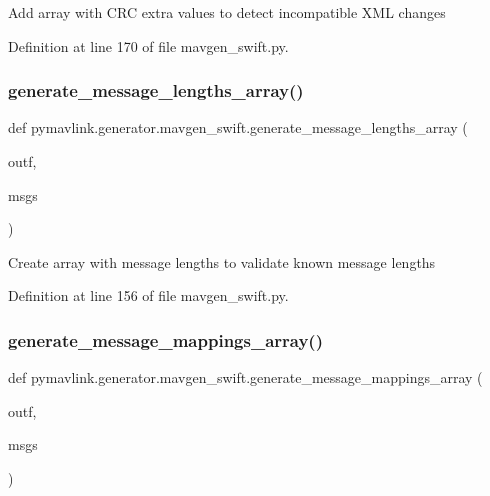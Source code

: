 \begin{DoxyVerb}Add array with CRC extra values to detect incompatible XML changes\end{DoxyVerb}
 

Definition at line 170 of file mavgen\+\_\+swift.\+py.

\mbox{\label{namespacepymavlink_1_1generator_1_1mavgen__swift_ac76b28b77a9b6d1040ac2dacba539420}} 
\subsubsection{\texorpdfstring{generate\_message\_lengths\_array()}{generate\_message\_lengths\_array()}}
{\footnotesize\ttfamily def pymavlink.\+generator.\+mavgen\+\_\+swift.\+generate\+\_\+message\+\_\+lengths\+\_\+array (\begin{DoxyParamCaption}\item[{}]{outf,  }\item[{}]{msgs }\end{DoxyParamCaption})}

\begin{DoxyVerb}Create array with message lengths to validate known message lengths\end{DoxyVerb}
 

Definition at line 156 of file mavgen\+\_\+swift.\+py.

\mbox{\label{namespacepymavlink_1_1generator_1_1mavgen__swift_a905071cf7748346eb9e0c8fccde6405f}} 
\subsubsection{\texorpdfstring{generate\_message\_mappings\_array()}{generate\_message\_mappings\_array()}}
{\footnotesize\ttfamily def pymavlink.\+generator.\+mavgen\+\_\+swift.\+generate\+\_\+message\+\_\+mappings\+\_\+array (\begin{DoxyParamCaption}\item[{}]{outf,  }\item[{}]{msgs }\end{DoxyParamCaption})}

